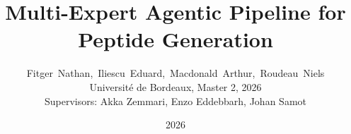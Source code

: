 \title{Multi-Expert Agentic Pipeline for Peptide Generation}

\author{Fitger~Nathan,~Iliescu~Eduard,~Macdonald~Arthur,~Roudeau~Niels\\
Universit\'e de Bordeaux, Master 2, 2026\\
Supervisors: Akka Zemmari, Enzo Eddebbarh, Johan Samot}

\date{2026}
